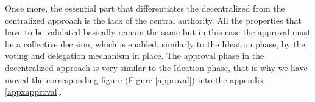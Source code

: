 Once more, the essential part that differentiates the decentralized from the centralized approach is the lack of the central authority. All the properties that have to be validated basically remain the same but in this case the approval must be a collective decision, which is enabled, similarly to the Ideation phase, by the voting and delegation mechanism in place. The approval phase in the decentralized approach is very similar to the Ideation phase, that is why we have moved the corresponding figure (Figure \ref{approval}) into the appendix \ref{appxapproval}.




